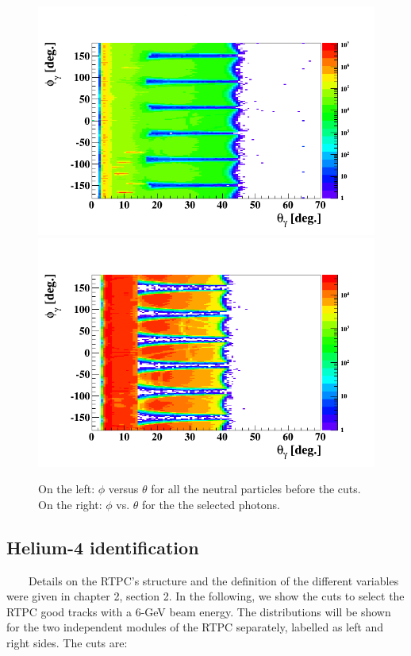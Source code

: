 \begin{figure}[tbp]
\hspace{-0.2in}
\includegraphics[scale=0.35]{fig_analysis/photon_phi_theta_1.png}
\includegraphics[scale=0.35]{fig_analysis/photon_phi_theta_2.png}
\caption{On the left: $\phi$ versus $\theta$ for all the neutral particles before the cuts. On the right: $\phi$ vs. $\theta$ for the the selected photons.} 
\label{fig:photon_phi_theta}
\end{figure}

\subsection{Helium-4 identification}
~~~~Details on the RTPC's structure and the definition of the different 
variables were given in chapter 2, section 2. In the following, we show the 
cuts to select the RTPC good tracks with a 6-GeV beam energy. The distributions 
will be shown for the two independent modules of the RTPC separately, labelled 
as left and right sides. The cuts are:

